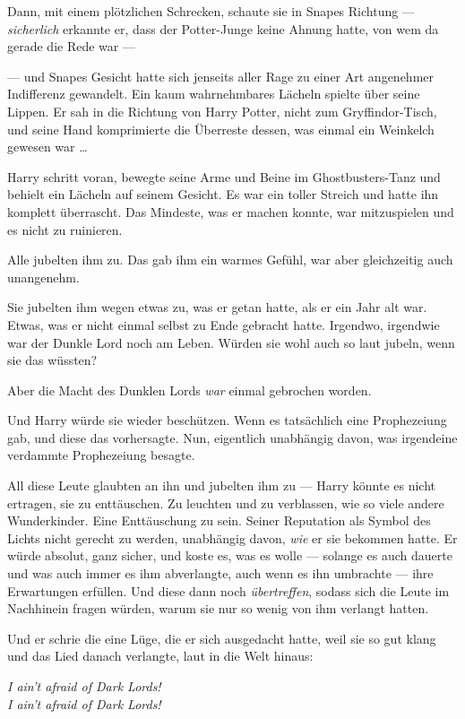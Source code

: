 Dann, mit einem plötzlichen Schrecken, schaute sie in Snapes Richtung — \emph{sicherlich} erkannte er, dass der Potter-Junge keine Ahnung hatte, von wem da gerade die Rede war —

— und Snapes Gesicht hatte sich jenseits aller Rage zu einer Art angenehmer Indifferenz gewandelt. Ein kaum wahrnehmbares Lächeln spielte über seine Lippen. Er sah in die Richtung von Harry Potter, nicht zum Gryffindor-Tisch, und seine Hand komprimierte die Überreste dessen, was einmal ein Weinkelch gewesen war …

Harry schritt voran, bewegte seine Arme und Beine im Ghostbusters-Tanz und behielt ein Lächeln auf seinem Gesicht. Es war ein toller Streich und hatte ihn komplett überrascht. Das Mindeste, was er machen konnte, war mitzuspielen und es nicht zu ruinieren.

Alle jubelten ihm zu. Das gab ihm ein warmes Gefühl, war aber gleichzeitig auch unangenehm.

Sie jubelten ihm wegen etwas zu, was er getan hatte, als er ein Jahr alt war. Etwas, was er nicht einmal selbst zu Ende gebracht hatte. Irgendwo, irgendwie war der Dunkle Lord noch am Leben. Würden sie wohl auch so laut jubeln, wenn sie das wüssten?

Aber die Macht des Dunklen Lords \emph{war} einmal gebrochen worden.

Und Harry würde sie wieder beschützen. Wenn es tatsächlich eine Prophezeiung gab, und diese das vorhersagte. Nun, eigentlich unabhängig davon, was irgendeine verdammte Prophezeiung besagte.

All diese Leute glaubten an ihn und jubelten ihm zu — Harry könnte es nicht ertragen, sie zu enttäuschen. Zu leuchten und zu verblassen, wie so viele andere Wunderkinder. Eine Enttäuschung zu sein. Seiner Reputation als Symbol des Lichts nicht gerecht zu werden, unabhängig davon, \emph{wie} er sie bekommen hatte. Er würde absolut, ganz sicher, und koste es, was es wolle — solange es auch dauerte und was auch immer es ihm abverlangte, auch wenn es ihn umbrachte — ihre Erwartungen erfüllen. Und diese dann noch \emph{übertreffen}, sodass sich die Leute im Nachhinein fragen würden, warum sie nur so wenig von ihm verlangt hatten.

Und er schrie die eine Lüge, die er sich ausgedacht hatte, weil sie so gut klang und das Lied danach verlangte, laut in die Welt hinaus:

\begin{center}
\emph{I ain’t afraid of Dark Lords!\\
I ain’t afraid of Dark Lords!}
\end{center}

